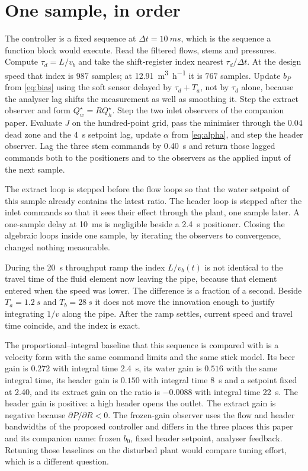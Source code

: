 \documentclass[conference,a4paper]{IEEEtran}
\begin{document}
\section{One sample, in order}
The controller is a fixed sequence at $\Delta t=\SI{10}{ms}$, which is the sequence a function block would execute. Read the filtered flows, stems and pressures. Compute $\tau_d=L/v_b$ and take the shift-register index nearest $\tau_d/\Delta t$. At the design speed that index is $987$ samples; at \SI{12.91}{\cubic\metre\per\hour} it is $767$ samples. Update $b_P$ from \eqref{eq:bias} using the soft sensor delayed by $\tau_d+T_a$, not by $\tau_d$ alone, because the analyser lag shifts the measurement as well as smoothing it. Step the extract observer and form $Q_w^\star=R Q_h^\star$. Step the two inlet observers of the companion paper. Evaluate $J$ on the hundred-point grid, pass the minimiser through the \SI{0.04}{\barg} dead zone and the \SI{4}{s} setpoint lag, update $\alpha$ from \eqref{eq:alpha}, and step the header observer. Lag the three stem commands by \SI{0.40}{s} and return those lagged commands both to the positioners and to the observers as the applied input of the next sample.

The extract loop is stepped before the flow loops so that the water setpoint of this sample already contains the latest ratio. The header loop is stepped after the inlet commands so that it sees their effect through the plant, one sample later. A one-sample delay at \SI{10}{ms} is negligible beside a \SI{2.4}{s} positioner. Closing the algebraic loops inside one sample, by iterating the observers to convergence, changed nothing measurable.

During the \SI{20}{s} throughput ramp the index $L/v_b(t)$ is not identical to the travel time of the fluid element now leaving the pipe, because that element entered when the speed was lower. The difference is a fraction of a second. Beside $T_a=\SI{1.2}{s}$ and $T_b=\SI{28}{s}$ it does not move the innovation enough to justify integrating $1/v$ along the pipe. After the ramp settles, current speed and travel time coincide, and the index is exact.

The proportional--integral baseline that this sequence is compared with is a velocity form with the same command limits and the same stick model. Its beer gain is $0.272$ with integral time \SI{2.4}{s}, its water gain is $0.516$ with the same integral time, its header gain is $0.150$ with integral time \SI{8}{s} and a setpoint fixed at \SI{2.40}{\barg}, and its extract gain on the ratio is $-0.0088$ with integral time \SI{22}{s}. The header gain is positive: a high header opens the outlet. The extract gain is negative because $\partial P/\partial R<0$. The frozen-gain observer uses the flow and header bandwidths of the proposed controller and differs in the three places this paper and its companion name: frozen $b_0$, fixed header setpoint, analyser feedback. Retuning those baselines on the disturbed plant would compare tuning effort, which is a different question.
\end{document}
